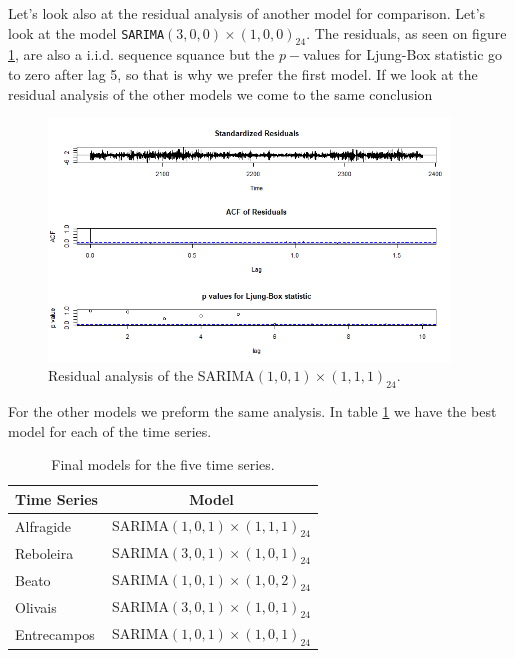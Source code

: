 \documentclass{article}
\begin{document}
Let's look also at the residual analysis of another model for comparison. Let's look at 
the model   \verb|SARIMA|$(3,0,0) \times (1,0,0)_{24}$. The residuals, as seen on 
figure \ref{fig:res_o2}, are also a i.i.d. sequence squance but the $p-$values for 
Ljung-Box statistic go to zero after lag 5, so that is why we prefer the first model.
If we look at the residual analysis of the other models we come to the same conclusion

\begin{figure}[ht!]
    \centering
    \includegraphics[width=0.95\textwidth]{Plots1/ra_2.png}
    \caption{Residual analysis of the SARIMA$(1,0,1) \times (1,1,1)_{24}$.}
    \label{fig:res_o2}
\end{figure}


For the other models we preform the same analysis. In table \ref{tab:final_ozon} we have the best 
model for each of the time series.

\begin{table}
    \centering
    \begin{tabular}{|l|c|}
        \hline
        Time Series & Model \\
        \hline
        Alfragide & SARIMA$(1,0,1) \times (1,1,1)_{24}$ \\
        \hline
        Reboleira & SARIMA$(3,0,1) \times (1,0,1)_{24}$  \\
        \hline
        Beato &   SARIMA$(1,0,1) \times (1,0,2)_{24}$ \\
        \hline
        Olivais &  SARIMA$(3,0,1) \times (1,0,1)_{24}$  \\
        \hline
        Entrecampos &  SARIMA$(1,0,1) \times (1,0,1)_{24}$ \\
        \hline
    \end{tabular}
    \caption{Final models for the five time series.}
    \label{tab:final_ozon}
\end{table}
    
\end{document}
